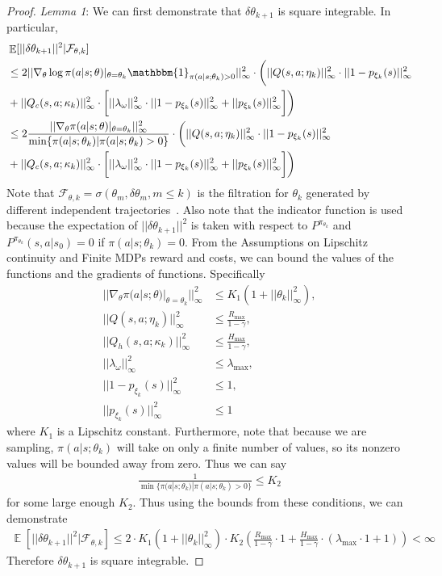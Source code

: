 \documentclass{article}
\theoremstyle{definition}
\DeclareMathOperator*{\E}{\mathbb{E}}
\begin{document}
\begin{proof}
\emph{Lemma 1}: We can first demonstrate that $\delta \theta_{k+1}$ is square integrable. In particular,
\begin{align*}
    &\E[||\delta \theta_{k+1}||^2 | \mathcal{F}_{\theta,k}]\\
    &\leq 2 || \nabla_\theta \log \pi(a|s; \theta)|_{\theta=\theta_k} \mathbbm{1}_{\pi(a|s;\theta_k) > 0}||^2_\infty \cdot \bigg(||Q(s,a;\eta_k)||^2_\infty \cdot ||1 - p_{\xi_k}(s)||^2_\infty \\
    &+ ||Q_c(s,a;\kappa_k)||^2_\infty \cdot \biggl[||\lambda_\omega||^2_\infty \cdot ||1 - p_{\xi_k}(s)||^2_\infty + ||p_{\xi_k}(s)||^2_\infty\biggr]\bigg) \\
    &\leq 2 \frac{|| \nabla_\theta \pi(a|s; \theta)|_{\theta=\theta_k}||^2_\infty}{\min\{ \pi(a|s;\theta_k) | \pi(a|s;\theta_k) > 0\}} \cdot \bigg(||Q(s,a;\eta_k)||^2_\infty \cdot ||1 - p_{\xi_k}(s)||^2_\infty \\
    &+ ||Q_c(s,a;\kappa_k)||^2_\infty \cdot \biggl[||\lambda_\omega||^2_\infty \cdot ||1 - p_{\xi_k}(s)||^2_\infty + ||p_{\xi_k}(s)||^2_\infty\biggr]\bigg) 
\end{align*}
Note that $\mathcal{F}_{\theta,k}=\sigma(\theta_m, \delta \theta_m, m\leq k)$ is the filtration for $\theta_k$ generated by different independent trajectories~\cite{chow2017risk}.
Also note that the indicator function is used because the expectation of $||\delta \theta_{k+1}||^2$ is taken with respect to $P^{\pi_{\theta_k}}$ and $P^{\pi_{\theta_k}}(s,a|s_0)=0$ if $\pi(a|s;\theta_k)=0$.
From the Assumptions on Lipschitz continuity and Finite MDPs reward and costs, we can bound the values of the functions and the gradients of functions. Specifically
\begin{align*}
    || \nabla_\theta \pi(a|s; \theta)|_{\theta=\theta_k}||^2_\infty &\leq K_1(1 + ||\theta_k||^2_\infty),\\
    ||Q(s,a;\eta_k)||^2_\infty &\leq \frac{R_{\max}}{1-\gamma}, \\
    ||Q_h(s,a;\kappa_k)||^2_\infty &\leq \frac{H_{\max}}{1-\gamma}, \\
    ||\lambda_\omega||^2_\infty &\leq \lambda_{\max}, \\
    ||1 - p_{\xi_k}(s)||^2_\infty &\leq 1, \\
    ||p_{\xi_k}(s)||^2_\infty &\leq 1
\end{align*}
where $K_1$ is a Lipschitz constant. Furthermore, note that because we are sampling, $\pi(a|s;\theta_k)$ will take on only a finite number of values, so its nonzero values will be bounded away from zero. Thus we can say
\begin{align*}
    \frac{1}{\min\{ \pi(a|s;\theta_k) | \pi(a|s;\theta_k) > 0\}} \leq K_2
\end{align*}
for some large enough $K_2$. Thus using the bounds from these conditions, we can demonstrate
\begin{align*}
    \E[||\delta \theta_{k+1}||^2 | \mathcal{F}_{\theta,k}] \leq 2\cdot K_1(1 + ||\theta_k||^2_\infty)\cdot K_2(\frac{R_{\max}}{1-\gamma}\cdot 1 + \frac{H_{\max}}{1-\gamma}\cdot(\lambda_{\max}\cdot 1 + 1)) < \infty
\end{align*}
Therefore $\delta \theta_{k+1}$ is square integrable.


\end{proof}
\end{document}
